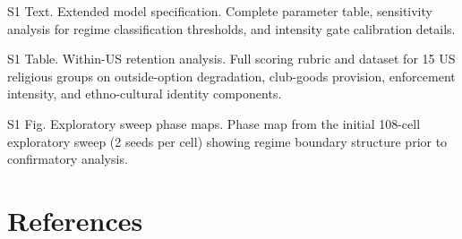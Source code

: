 \documentclass[12pt]{article}
\begin{document}
S1 Text. Extended model specification. Complete parameter table, sensitivity analysis for regime classification thresholds, and intensity gate calibration details.

S1 Table. Within-US retention analysis. Full scoring rubric and dataset for 15 US religious groups on outside-option degradation, club-goods provision, enforcement intensity, and ethno-cultural identity components.

S1 Fig. Exploratory sweep phase maps. Phase map from the initial 108-cell exploratory sweep (2 seeds per cell) showing regime boundary structure prior to confirmatory analysis.

%
\section*{References}
\end{document}
